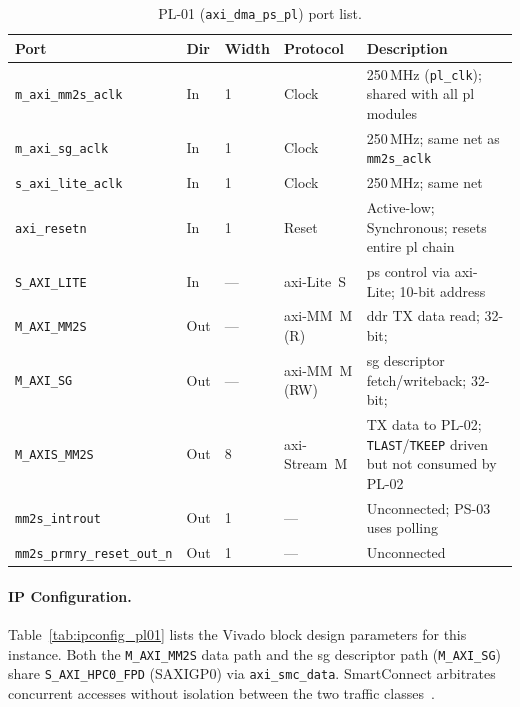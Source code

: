 \begin{table}[htbp]
  \caption{PL-01 (\texttt{axi\_dma\_ps\_pl}) port list.}
  \label{tab:ports_pl01}
  \centering
  \small
  \begin{tabular}{l l l p{2.0cm} p{5.6cm}}
    \hline
    Port & Dir & Width & Protocol & Description \\
    \hline
    \texttt{m\_axi\_mm2s\_aclk}
      & In  & 1 & Clock
      & 250\,MHz (\texttt{pl\_clk}); shared with all \ac{pl} modules \\
    \texttt{m\_axi\_sg\_aclk}
      & In  & 1 & Clock
      & 250\,MHz; same net as \texttt{mm2s\_aclk} \\
    \texttt{s\_axi\_lite\_aclk}
      & In  & 1 & Clock
      & 250\,MHz; same net \\
    \texttt{axi\_resetn}
      & In  & 1 & Reset
      & Active-low; Synchronous;
        resets entire \ac{pl} chain \\
    \texttt{S\_AXI\_LITE}
      & In  & — & \ac{axi}-Lite~S
      & \ac{ps} control via \ac{axi}-Lite;
        10-bit address \\
    \texttt{M\_AXI\_MM2S}
      & Out & — & \ac{axi}-MM~M (R)
      & \ac{ddr} TX data read; 32-bit; \\
    \texttt{M\_AXI\_SG}
      & Out & — & \ac{axi}-MM~M (RW)
      & \ac{sg} descriptor fetch/writeback; 32-bit;\\
    \texttt{M\_AXIS\_MM2S}
      & Out & 8 & \ac{axi}-Stream~M
      & TX data to PL-02; \texttt{TLAST}/\texttt{TKEEP} driven
        but not consumed by PL-02 \\
    \texttt{mm2s\_introut}
      & Out & 1 & —
      & Unconnected; PS-03 uses polling \\
    \texttt{mm2s\_prmry\_reset\_out\_n}
      & Out & 1 & —
      & Unconnected \\
    \hline
  \end{tabular}
\end{table}
\FloatBarrier


\FloatBarrier
\paragraph{IP Configuration.}

Table~\ref{tab:ipconfig_pl01} lists the Vivado block design parameters
for this instance.
Both the \texttt{M\_AXI\_MM2S} data path and the \ac{sg} descriptor
path (\texttt{M\_AXI\_SG}) share \texttt{S\_AXI\_HPC0\_FPD} (SAXIGP0)
via \texttt{axi\_smc\_data}. SmartConnect arbitrates concurrent accesses
without isolation between the two traffic classes~\cite{AMD_PG247}.


